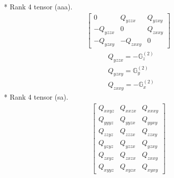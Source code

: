 \documentclass[fleqn,8pt,landscape]{jsarticle}
\begin{document}
* Rank 4 tensor (aaa).
\begin{align*}
\begin{bmatrix} 0 & Q_{yzzx} & Q_{yzxy} \\ - Q_{yzzx} & 0 & Q_{zxxy} \\ - Q_{yzxy} & - Q_{zxxy} & 0 \end{bmatrix}
\end{align*}
\begin{align*}
& Q_{yzzx} = - \mathbb{G}_{z}^{(2)} \\
& Q_{yzxy} = \mathbb{G}_{y}^{(2)} \\
& Q_{zxxy} = - \mathbb{G}_{x}^{(2)}
\end{align*}
* Rank 4 tensor (sa).
\begin{align*}
\begin{bmatrix} Q_{xxyz} & Q_{xxzx} & Q_{xxxy} \\ Q_{yyyz} & Q_{yyzx} & Q_{yyxy} \\ Q_{zzyz} & Q_{zzzx} & Q_{zzxy} \\ Q_{yzyz} & Q_{yzzx} & Q_{yzxy} \\ Q_{zxyz} & Q_{zxzx} & Q_{zxxy} \\ Q_{xyyz} & Q_{xyzx} & Q_{xyxy} \end{bmatrix}
\end{align*}
\end{document}
